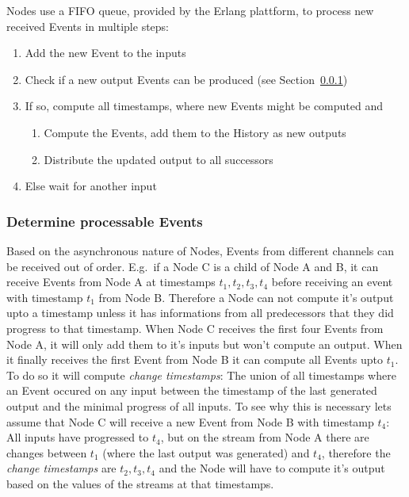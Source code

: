 Nodes use a FIFO queue, provided by the Erlang plattform, to process new received Events in multiple steps:
\begin{enumerate}
  \item Add the new Event to the inputs
  \item Check if a new output Events can be produced (see Section~\ref{sec:concepts:defs:nodes:processable})
  \item If so, compute all timestamps, where new Events might be computed and
    \begin{enumerate}
      \item Compute the Events, add them to the History as new outputs
      \item Distribute the updated output to all successors
    \end{enumerate}
  \item Else wait for another input
\end{enumerate}

\subsubsection{Determine processable Events}
\label{sec:concepts:defs:nodes:processable}

Based on the asynchronous nature of Nodes, Events from different channels can be received out of order.
E.g.\ if a Node C is a child of Node A and B, it can receive Events from Node A at timestamps \(t_1, t_2, t_3, t_4\)
before receiving an event with timestamp \(t_1\) from Node B.
Therefore a Node can not compute it's output upto a timestamp unless it has informations from all predecessors that they did progress to that timestamp.
When Node C receives the first four Events from Node A, it will only add them to it's inputs but won't compute an output.
When it finally receives the first Event from Node B it can compute all Events upto \(t_1\).
To do so it will compute \emph{change timestamps}: The union of all timestamps where an Event occured on any input between the timestamp of the last generated output and the minimal progress of all inputs.
To see why this is necessary lets assume that Node C will receive a new Event from Node B with timestamp \(t_4\):
All inputs have progressed to \(t_4\), but on the stream from Node A there are changes between \(t_1\) (where the last output was generated) and \(t_4\),
therefore the \emph{change timestamps} are \(t_2, t_3, t_4\) and the Node will have to compute it's output based on the values of the streams at that timestamps.


